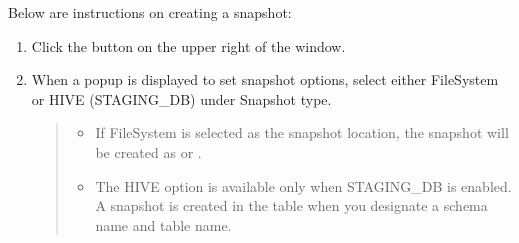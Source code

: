 \documentclass[letterpaper,10pt,english]{sphinxmanual}
\begin{document}
Below are instructions on creating a snapshot:
\begin{enumerate}
\def\theenumi{\arabic{enumi}}
\def\labelenumi{\theenumi .}
\makeatletter\def\p@enumii{\p@enumi \theenumi .}\makeatother
\item {} 
Click the  button on the upper right of the {\hyperref[\detokenize{discovery/part07/edit_rules::doc}]{}} window.
\begin{quote}

\begin{figure}[H]
\centering

\noindent{}
\end{figure}
\end{quote}

\item {} 
When a popup is displayed to set snapshot options, select either FileSystem or HIVE (STAGING\_DB) under Snapshot type.
\begin{quote}

\begin{figure}[H]
\centering

\noindent{}
\end{figure}
\begin{itemize}
\item {} 
If FileSystem is selected as the snapshot location, the snapshot will be created as  or .
\begin{quote}

\begin{figure}[H]
\centering

\noindent{}
\end{figure}
\end{quote}

\item {} 
The HIVE option is available only when STAGING\_DB is enabled. A snapshot is created in the table when you designate a schema name and table name.
\begin{quote}

\begin{figure}[H]
\centering

\noindent{}
\end{figure}
\end{quote}


\end{itemize}
\end{quote}
\end{enumerate}
\end{document}
